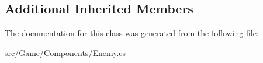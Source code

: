\subsection*{Additional Inherited Members}


The documentation for this class was generated from the following file\+:\begin{DoxyCompactItemize}
\item 
src/\+Game/\+Components/Enemy.\+cs\end{DoxyCompactItemize}
